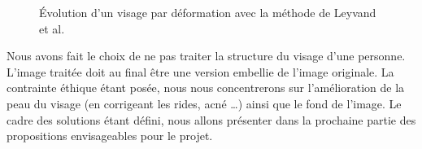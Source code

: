 \documentclass[11pt, french]{report-rd-info}
\begin{document}
\begin{figure}[htp]
 \centering
 \caption{Évolution d’un visage par déformation avec la méthode de Leyvand et al. \cite{Leyvand2008}}
 \label{fig:VisagesData}
\end{figure}

Nous avons fait le choix de ne pas traiter la structure du visage d’une personne. L’image traitée doit au final être une version embellie de l’image originale. La contrainte éthique étant posée,  nous nous concentrerons sur l’amélioration de la peau du visage (en corrigeant les rides, acné \ldots) ainsi que le fond de l’image.
Le cadre des solutions étant défini, nous allons présenter dans la prochaine partie des propositions envisageables pour le projet.
\end{document}
